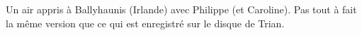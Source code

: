 Un air appris à Ballyhaunis (Irlande) avec Philippe (et Caroline). Pas tout à
fait la même version que ce qui est enregistré sur le disque de Trian.

\tune
